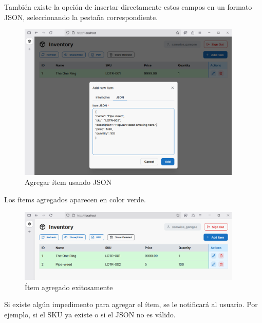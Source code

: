 También existe la opción de insertar directamente estos campos en un formato JSON, seleccionando la pestaña correspondiente.

\begin{figure}[H]
    \centering
    \includegraphics[width=0.95\textwidth]{images/7 Agregar JSON}
    \caption{Agregar ítem usando JSON}
\end{figure}

Los ítems agregados aparecen en color verde.

\begin{figure}[H]
    \centering
    \includegraphics[width=0.95\textwidth]{images/8 Agregado}
    \caption{Ítem agregado exitosamente}
\end{figure}

Si existe algún impedimento para agregar el ítem, se le notificará al usuario. Por ejemplo, si el SKU ya existe o si el JSON no es válido.


